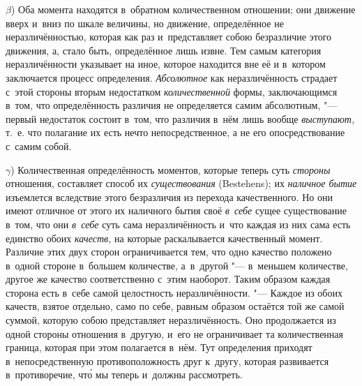 $\beta$) Оба момента находятся в~обратном количественном отношении; они
движение вверх и~вниз по шкале величины, но движение, определённое не
неразличённостью, которая как раз и~представляет собою безразличие этого
движения, а, стало быть, определённое лишь извне. Тем самым категория
неразличённости указывает на иное, которое находится вне её и
в~котором заключается процесс определения. {\em Абсолютное} как неразличённость
страдает с~этой стороны вторым недостатком {\em количественной} формы,
заключающимся в~том, что определённость различия не определяется самим
абсолютным, "--- первый недостаток состоит в~том, что различия в~нём лишь
вообще {\em выступают,} т.~е. что полагание их есть нечто непосредственное, а
не его опосредствование с~самим собой.

$\gamma$) Количественная определённость моментов, которые теперь суть
{\em стороны} отношения, составляет способ их {\em существования} (Be\-ste\-hens);
их {\em наличное бытие} изъемлется вследствие этого безразличия из перехода
качественного. Но они имеют отличное от этого их наличного бытия своё
{\em в~себе} сущее существование в~том, что они {\em в~себе} суть сама
неразличённость и~что каждая из них сама есть единство обоих {\em качеств,} на
которые раскалывается качественный момент. Различие этих двух сторон
ограничивается тем, что одно качество положено в~одной стороне в~большем
количестве, а~в~другой "--- в~меньшем количестве, другое же качество
соответственно с~этим наоборот. Таким образом каждая сторона есть в~себе самой
целостность неразличённости. "--- Каждое из обоих качеств, взятое отдельно,
само по себе, равным образом остаётся той же самой суммой, которую собою
представляет неразличённость. Оно продолжается из одной стороны отношения
в~другую, и~его не ограничивает та количественная граница, которая при этом
полагается в~нём. Тут определения приходят в~непосредственную противоположность
друг к~другу, которая развивается в~противоречие, чт\'{о} мы теперь и~должны
рассмотреть.

